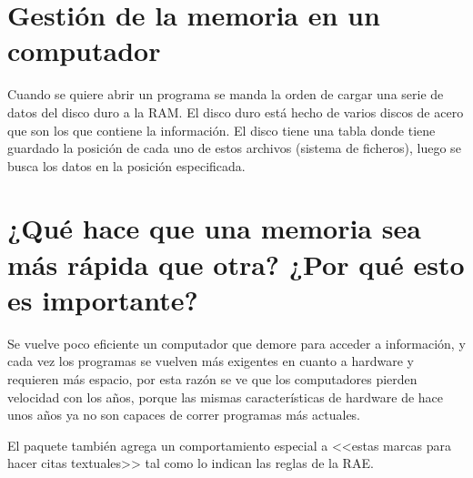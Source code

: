 \documentclass{article}
\begin{document}
\section*{Gestión de la memoria en un computador}
Cuando se quiere abrir un programa se manda la orden de cargar una serie de datos del disco duro a la RAM. El disco duro está hecho de varios discos de acero que son los que contiene la información. El disco tiene una tabla donde tiene guardado la posición de cada uno de estos archivos (sistema de ficheros), luego se busca los datos en la posición especificada.

\section*{¿Qué hace que una memoria sea más rápida que otra? ¿Por qué esto es importante?}
Se vuelve poco eficiente un computador que demore para acceder a información, y cada vez los programas se vuelven más exigentes en cuanto a hardware y requieren más espacio, por esta razón se ve que los computadores pierden velocidad con los años, porque las mismas características de hardware de hace unos años ya no son capaces de correr programas más actuales.

El paquete también agrega un comportamiento especial 
a <<estas marcas para hacer citas textuales>> tal como 
lo indican las reglas de la RAE. \cite{romram}

\vspace{5mm}



\clearpage


\nocite{*}
\end{document}
